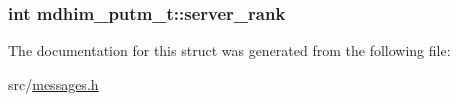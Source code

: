 \hypertarget{structmdhim__putm__t_ad51fbdc39b6f3f8951b4e87a4f57e3bd}{
\subsubsection[{server\-\_\-rank}]{\setlength{\rightskip}{0pt plus 5cm}int mdhim\-\_\-putm\-\_\-t\-::server\-\_\-rank}}\label{d6/dcd/structmdhim__putm__t_ad51fbdc39b6f3f8951b4e87a4f57e3bd}


The documentation for this struct was generated from the following file\-:\begin{DoxyCompactItemize}
\item 
src/\hyperlink{messages_8h}{messages.\-h}\end{DoxyCompactItemize}
